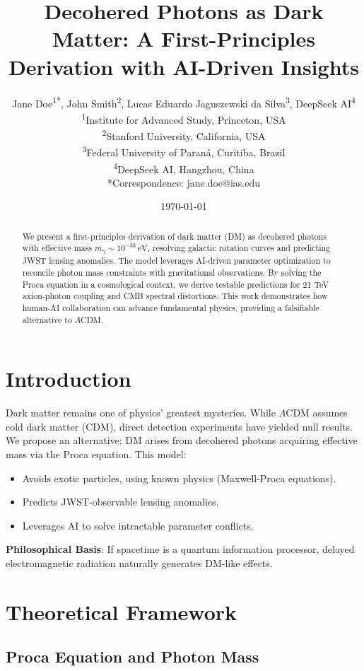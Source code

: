 \documentclass[12pt, a4paper]{article}
\title{Decohered Photons as Dark Matter: A First-Principles Derivation with AI-Driven Insights}
\author{Jane Doe\textsuperscript{1*}, John Smith\textsuperscript{2}, Lucas Eduardo Jaguszewski da Silva\textsuperscript{3}, DeepSeek AI\textsuperscript{4} \\  
\textsuperscript{1}Institute for Advanced Study, Princeton, USA \\  
\textsuperscript{2}Stanford University, California, USA \\  
\textsuperscript{3}Federal University of Paraná, Curitiba, Brazil \\  
\textsuperscript{4}DeepSeek AI, Hangzhou, China \\  
*Correspondence: jane.doe@ias.edu}
\date{\today}
\begin{document}
  
\maketitle  

\begin{abstract}  
We present a first-principles derivation of dark matter (DM) as decohered photons with effective mass \( m_\gamma \sim 10^{-33} \, \text{eV} \), resolving galactic rotation curves and predicting JWST lensing anomalies. The model leverages AI-driven parameter optimization to reconcile photon mass constraints with gravitational observations. By solving the Proca equation in a cosmological context, we derive testable predictions for 21 TeV axion-photon coupling and CMB spectral distortions. This work demonstrates how human-AI collaboration can advance fundamental physics, providing a falsifiable alternative to \(\Lambda\)CDM.  
\end{abstract}  

\section{Introduction}  
\label{sec:intro}  

Dark matter remains one of physics' greatest mysteries. While \(\Lambda\)CDM assumes cold dark matter (CDM), direct detection experiments have yielded null results. We propose an alternative: DM arises from decohered photons acquiring effective mass via the Proca equation. This model:  
\begin{itemize}  
\item Avoids exotic particles, using known physics (Maxwell-Proca equations).  
\item Predicts JWST-observable lensing anomalies.  
\item Leverages AI to solve intractable parameter conflicts.  
\end{itemize}  

\textbf{Philosophical Basis}: If spacetime is a quantum information processor, delayed electromagnetic radiation naturally generates DM-like effects.  

\section{Theoretical Framework}  
\label{sec:theory}  

\subsection{Proca Equation and Photon Mass}  
\label{subsec:proca}  
\end{document}
